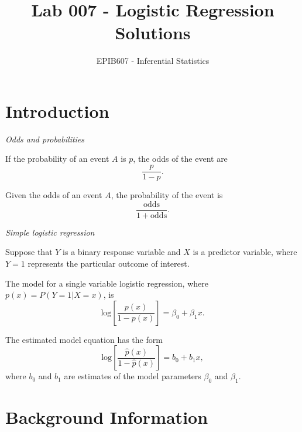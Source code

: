 \documentclass[letterpaper,12pt,twoside,]{pinp}
\title{Lab 007 - Logistic Regression Solutions}
\author[a]{EPIB607 - Inferential Statistics}
\affil[a]{Fall 2020, McGill University}
\begin{document}
\verticaladjustment{-2pt}

\maketitle
\thispagestyle{firststyle}



\hypertarget{introduction}{%
\section{Introduction}\label{introduction}}

\emph{Odds and probabilities}

If the probability of an event \(A\) is \(p\), the odds of the event are
\[\dfrac{p}{1 - p}. \]

Given the odds of an event \(A\), the probability of the event is
\[\dfrac{\text{odds}}{1 + \text{odds}}. \]

\emph{Simple logistic regression}

Suppose that \(Y\) is a binary response variable and \(X\) is a
predictor variable, where \(Y = 1\) represents the particular outcome of
interest.

The model for a single variable logistic regression, where
\(p(x) = P(Y = 1 | X = x)\), is
\[\text{log} \left[ \dfrac{p(x)}{1 - p(x)} \right] = \beta_0 + \beta_1 x. \]

The estimated model equation has the form
\[\text{log} \left[ \dfrac{\hat{p}(x)}{1 - \hat{p}(x)} \right] = b_0 + b_1 x, \]
where \(b_0\) and \(b_1\) are estimates of the model parameters
\(\beta_0\) and \(\beta_1\).

\newpage

\hypertarget{background-information}{%
\section{Background Information}\label{background-information}}
\end{document}
